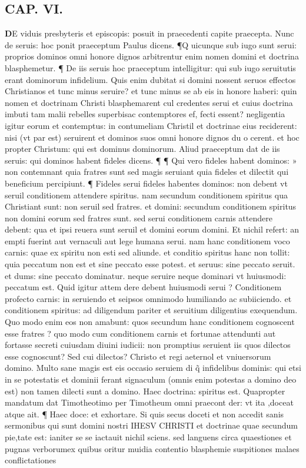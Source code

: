 \documentclass{article}
\begin{document}
\begin{pages}
\endnumbering\beginnumbering\section{CAP. VI.}\pstart \huge\textbf{D}\normalsize E viduis presbyteris et episcopis: posuit in praecedenti capite praecepta. Nunc de seruis: hoc ponit praeceptum Paulus dicens. ¶Q uicunque sub iugo sunt serui: proprios dominos omni honore dignos arbitrentur enim nomen domini et doctrina blasphemetur. ¶ De iis seruis hoc praeceptum intelligitur: qui sub iugo seruitutis erant dominorum infidelium. Quis enim dubitat si domini nossent seruos effectos Christianos et tunc minus seruire? et tunc minus se ab eis in honore haberi: quin nomen et doctrinam Christi blasphemarent cul credentes serui et cuius doctrina imbuti tam malii rebelles superbisac contemptores ef, fecti essent? negligentia igitur eorum et contemptus: in contumeliam Christil et doctrinae eius reciderent: nisi (vt par est) seruirent et dominos suos omni honore dignos du o cerent. et hoc propter Christum: qui est dominus dominorum. Aliud praeceptum dat de  iis seruis: qui dominos habent fideles dicens. ¶ ¶ Qui vero fideles habent dominos: » non contemnant quia fratres sunt sed magis seruiant quia fideles et dilectit qui beneficium percipiunt. ¶ Fideles serui fideles habentes dominos: non debent vt seruil conditionem attendere spiritus. nam secundum conditionem spiritus qua Christiant sunt: non seruil sed fratres. et domini: secundum conditionem spiritus non domini eorum sed fratres sunt. sed serui conditionem carnis attendere debent: qua et ipsi reuera sunt seruil et domini eorum domini. Et nichil refert: an empti fuerint aut vernaculi aut lege humana serui. nam hanc conditionem voco carnis: quae ex spiritu non esti sed aliunde. et conditio spiritus hanc non tollit: quia peccatum non est et sine peccato esse potest. et seruus: sine peccato seruit. et dums: sine peccato dominatur. neque seruire neque dominari vt huiusmodi: peccatum est. Quid igitur attem dere debent huiusmodi serui ? Conditionem profecto carnis: in seruiendo et seipsos omnimodo humiliando ac subiiciendo. et conditionem spiritus: ad diligendum pariter et seruitium diligentius exequendum. Quo modo enim eos non amabunt: quos secundum hanc conditionem cognoscent esse fratres ? quo modo cum conditionem carnis et fortunae attendunti aut fortasse secreti cuiusdam diuini iudicii: non promptius seruient iis quos dilectos esse cognoscunt? Sed cui dilectos? Christo et regi aeternol et vniuersorum domino. Multo sane magis est eis occasio seruiem di q̃ infidelibus dominis: qui etsi in se potestatis et dominii ferant signaculum (omnis enim potestas a domino deo est) non tamen dilecti sunt a domino. Haec doctrina: spiritus est. Quapropter mandatum dat Timotheotimo per Timotheum omni praecont der: vt ita ,doceat atque ait. ¶ Haec doce: et exhortare. Si quis secus doceti et non accedit sanis sermonibus qui sunt domini nostri IHESV CHRISTI et doctrinae quae secundum pie,tate est: ianiter se se iactauit nichil sciens. sed languens circa quaestiones et pugnas verborumex quibus oritur muidia contentio blasphemie suspitiones malaes conflictationes  \pend

\end{pages}
\end{document}
